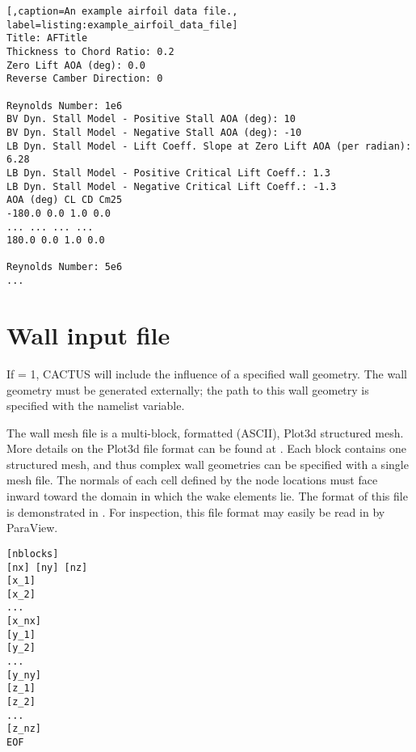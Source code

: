 \begin{lstlisting}[,caption=An example airfoil data file., label=listing:example_airfoil_data_file]
Title: AFTitle
Thickness to Chord Ratio: 0.2
Zero Lift AOA (deg): 0.0
Reverse Camber Direction: 0

Reynolds Number: 1e6
BV Dyn. Stall Model - Positive Stall AOA (deg): 10
BV Dyn. Stall Model - Negative Stall AOA (deg): -10
LB Dyn. Stall Model - Lift Coeff. Slope at Zero Lift AOA (per radian): 6.28
LB Dyn. Stall Model - Positive Critical Lift Coeff.: 1.3
LB Dyn. Stall Model - Negative Critical Lift Coeff.: -1.3
AOA (deg) CL CD Cm25
-180.0 0.0 1.0 0.0
... ... ... ...
180.0 0.0 1.0 0.0

Reynolds Number: 5e6
... 
\end{lstlisting}


\section{Wall input file}
If  = 1, CACTUS will include the influence of a specified wall geometry. The wall geometry must be generated externally; the path to this wall geometry is specified with the  namelist variable.

The wall mesh file is a multi-block, formatted (ASCII), Plot3d structured mesh. More details on the Plot3d file format can be found at . Each block contains one structured mesh, and thus complex wall geometries can be specified with a single mesh file. The normals of each cell defined by the node locations must face inward toward the domain in which the wake elements lie. The format of this file is demonstrated in . For inspection, this file format may easily be read in by ParaView.

\begin{lstlisting}[label=listing:plot3d_file_example,caption=Example file format for a multi-block Plot3d mesh file.]
[nblocks]
[nx] [ny] [nz]
[x_1]
[x_2]
...
[x_nx]
[y_1]
[y_2]
...
[y_ny]
[z_1]
[z_2]
...
[z_nz]
EOF
\end{lstlisting}